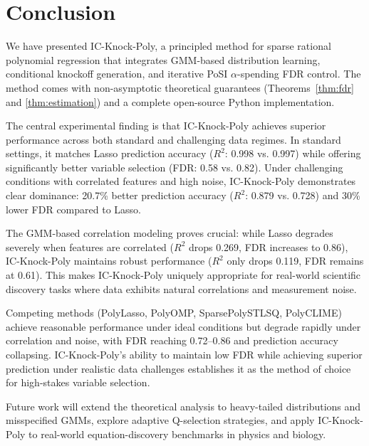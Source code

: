 \documentclass[11pt, a4paper]{article}
\begin{document}
\section{Conclusion}
\label{sec:conclusion}

We have presented IC-Knock-Poly, a principled method for sparse rational
polynomial regression that integrates GMM-based distribution learning,
conditional knockoff generation, and iterative PoSI $\alpha$-spending FDR
control.  The method comes with non-asymptotic theoretical guarantees
(Theorems~\ref{thm:fdr} and \ref{thm:estimation}) and a complete open-source
Python implementation.

The central experimental finding is that IC-Knock-Poly achieves superior
performance across both standard and challenging data regimes.  In standard
settings, it matches Lasso prediction accuracy ($R^2$: 0.998 vs. 0.997) while
offering significantly better variable selection (FDR: 0.58 vs. 0.82).  Under
challenging conditions with correlated features and high noise, IC-Knock-Poly
demonstrates clear dominance: 20.7\% better prediction accuracy ($R^2$: 0.879
vs. 0.728) and 30\% lower FDR compared to Lasso.

The GMM-based correlation modeling proves crucial: while Lasso degrades
severely when features are correlated ($R^2$ drops 0.269, FDR increases to
0.86), IC-Knock-Poly maintains robust performance ($R^2$ only drops 0.119,
FDR remains at 0.61).  This makes IC-Knock-Poly uniquely appropriate for
real-world scientific discovery tasks where data exhibits natural correlations
and measurement noise.

Competing methods (PolyLasso, PolyOMP, SparsePolySTLSQ, PolyCLIME) achieve
reasonable performance under ideal conditions but degrade rapidly under
correlation and noise, with FDR reaching 0.72--0.86 and prediction accuracy
collapsing.  IC-Knock-Poly's ability to maintain low FDR while achieving
superior prediction under realistic data challenges establishes it as the
method of choice for high-stakes variable selection.

Future work will extend the theoretical analysis to heavy-tailed distributions
and misspecified GMMs, explore adaptive Q-selection strategies, and apply
IC-Knock-Poly to real-world equation-discovery benchmarks in physics and
biology.



\end{document}
